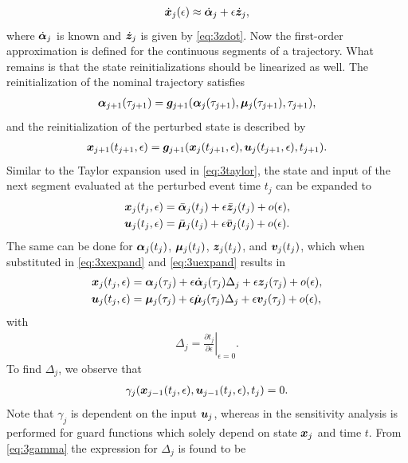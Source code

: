 \documentclass[../DC2017114Bouma.tex]{subfiles}
\begin{document}
\begin{align}
\dot{{\boldsymbol{x}}}_j(\epsilon) \approx \dot{\boldsymbol{\alpha}}_j + \epsilon\dot{{\boldsymbol{z}}}_j,
\end{align}
where $\dot{\boldsymbol{\alpha}}_j$ is known and $\dot{{\boldsymbol{z}}}_j$ is given by \eqref{eq:3zdot}. Now the first-order approximation is defined for the continuous segments of a trajectory. What remains is that the state reinitializations should be linearized as well. The reinitialization of the nominal trajectory satisfies
\begin{align}
\boldsymbol{\alpha}_{j+1}(\tau_{j+1}) = {\boldsymbol{g}}_{j+1}(\boldsymbol{\alpha}_j(\tau_{j+1}),\boldsymbol{\mu}_j(\tau_{j+1}),\tau_{j+1}),\label{eq:3g}
\end{align}
and the reinitialization of the perturbed state is described by
\begin{align}
{\boldsymbol{x}}_{j+1}(t_{j+1},\epsilon) = {\boldsymbol{g}}_{j+1}({\boldsymbol{x}}_j(t_{j+1},\epsilon),{\boldsymbol{u}}_j(t_{j+1},\epsilon),t_{j+1}).\label{eq:3gpert}
\end{align}
Similar to the Taylor expansion used in \eqref{eq:3taylor}, the state and input of the next segment evaluated at the perturbed event time $t_{j}$ can be expanded to
\begin{align}
{\boldsymbol{x}}_j(t_{j},\epsilon) &= \bar{\boldsymbol{\alpha}}_j(t_{j}) + \epsilon\bar{{\boldsymbol{z}}}_j(t_{j}) + o(\epsilon),\label{eq:3xexpand}\\
{\boldsymbol{u}}_j(t_{j},\epsilon) &= \bar{\boldsymbol{\mu}}_j(t_{j}) + \epsilon\bar{{\boldsymbol{v}}}_j(t_{j}) + o(\epsilon).\label{eq:3uexpand}
\end{align}
The same can be done for $\boldsymbol{\alpha}_j(t_{j})$, $\boldsymbol{\mu}_j(t_{j})$, ${\boldsymbol{z}}_j(t_{j})$, and ${\boldsymbol{v}}_j(t_{j})$, which when substituted in \eqref{eq:3xexpand} and \eqref{eq:3uexpand} results in
\begin{align}
{\boldsymbol{x}}_j(t_{j},\epsilon) &= \boldsymbol{\alpha}_j(\tau_j) + \epsilon\dot{\boldsymbol{\alpha}}_j(\tau_j)\Delta_j + \epsilon{\boldsymbol{z}}_j(\tau_j) + o(\epsilon),\label{eq:3xexpand2}\\
{\boldsymbol{u}}_j(t_{j},\epsilon) &= \boldsymbol{\mu}_j(\tau_j) + \epsilon\dot{\boldsymbol{\mu}}_j(\tau_j)\Delta_j + \epsilon{\boldsymbol{v}}_j(\tau_j) + o(\epsilon),\label{eq:3uexpand2}
\end{align}
with
\begin{align}
\Delta_{j} = \left.\frac{\partial t_{j}}{\partial\epsilon}\right|_{\epsilon=0}.\label{eq:3Delta}
\end{align}
To find $\Delta_{j}$, we observe that
\begin{align}
\gamma_j({\boldsymbol{x}}_{j-1}(t_{j},\epsilon),{\boldsymbol{u}}_{j-1}(t_{j},\epsilon),t_{j}) = 0.\label{eq:3gamma}
\end{align}
Note that $\gamma_j$ is dependent on the input ${\boldsymbol{u}}_j$, whereas in \cite{Chen2018a} the sensitivity analysis is performed for guard functions which solely depend on state ${\boldsymbol{x}}_j$ and time $t$. From \eqref{eq:3gamma} the expression for $\Delta_{j}$ is found to be
\end{document}
